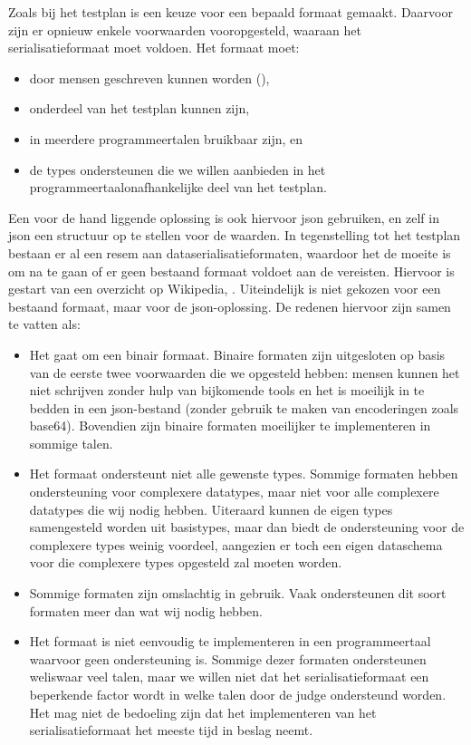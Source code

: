 Zoals bij het testplan is een keuze voor een bepaald formaat gemaakt.
Daarvoor zijn er opnieuw enkele voorwaarden vooropgesteld, waaraan het serialisatieformaat moet voldoen.
Het formaat moet:

\begin{itemize}
    \item door mensen geschreven kunnen worden (),
    \item onderdeel van het testplan kunnen zijn,
    \item in meerdere programmeertalen bruikbaar zijn, en
    \item de types ondersteunen die we willen aanbieden in het programmeertaalonafhankelijke deel van het testplan.
\end{itemize}

Een voor de hand liggende oplossing is ook hiervoor json gebruiken, en zelf in json een structuur op te stellen voor de waarden.
In tegenstelling tot het testplan bestaan er al een resem aan dataserialisatieformaten, waardoor het de moeite is om na te gaan of er geen bestaand formaat voldoet aan de vereisten.
Hiervoor is gestart van een overzicht op Wikipedia, \autocite{wiki2020}.
Uiteindelijk is niet gekozen voor een bestaand formaat, maar voor de json-oplossing.
De redenen hiervoor zijn samen te vatten als:

\begin{itemize}
    \item Het gaat om een binair formaat.
    Binaire formaten zijn uitgesloten op basis van de eerste twee voorwaarden die we opgesteld hebben: mensen kunnen het niet schrijven zonder hulp van bijkomende tools en het is moeilijk in te bedden in een json-bestand (zonder gebruik te maken van encoderingen zoals base64).
    Bovendien zijn binaire formaten moeilijker te implementeren in sommige talen.
    \item Het formaat ondersteunt niet alle gewenste types.
    Sommige formaten hebben ondersteuning voor complexere datatypes, maar niet voor alle complexere datatypes die wij nodig hebben.
    Uiteraard kunnen de eigen types samengesteld worden uit basistypes, maar dan biedt de ondersteuning voor de complexere types weinig voordeel, aangezien er toch een eigen dataschema voor die complexere types opgesteld zal moeten worden.
    \item Sommige formaten zijn omslachtig in gebruik.
    Vaak ondersteunen dit soort formaten meer dan wat wij nodig hebben.
    \item Het formaat is niet eenvoudig te implementeren in een programmeertaal waarvoor geen ondersteuning is.
    Sommige dezer formaten ondersteunen weliswaar veel talen, maar we willen niet dat het serialisatieformaat een beperkende factor wordt in welke talen door de judge ondersteund worden.
    Het mag niet de bedoeling zijn dat het implementeren van het serialisatieformaat het meeste tijd in beslag neemt.
\end{itemize}


